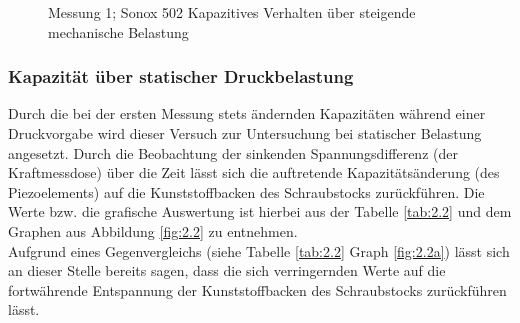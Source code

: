 \documentclass[12pt]{scrreprt} %
\begin{document}
\begin {figure}[htbp]
      \begin{center}
      \end{center}
	\caption[Messung 1; Sonox 502 Kapazitives Verhalten]{Messung 1; Sonox 502 Kapazitives Verhalten über steigende mechanische Belastung}
\label{fig:2.1}
\end{figure}

\subsubsection{Kapazität über statischer Druckbelastung}
Durch die bei der ersten Messung stets ändernden Kapazitäten während einer Druckvorgabe wird dieser Versuch zur Untersuchung bei statischer Belastung angesetzt. Durch die Beobachtung der sinkenden Spannungsdifferenz (der Kraftmessdose) über die Zeit lässt sich die auftretende Kapazitätsänderung (des Piezoelements) auf die Kunststoffbacken des Schraubstocks zurückführen. Die Werte bzw. die grafische Auswertung ist hierbei aus der Tabelle \vref{tab:2.2} und dem Graphen aus Abbildung \vref{fig:2.2} zu entnehmen. \\
Aufgrund eines Gegenvergleichs (siehe Tabelle \vref{tab:2.2} Graph \vref{fig:2.2a}) lässt sich an dieser Stelle bereits sagen, dass die sich verringernden Werte auf die fortwährende Entspannung der Kunststoffbacken des Schraubstocks zurückführen lässt.
\end{document}
